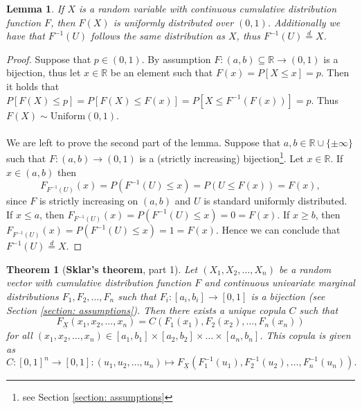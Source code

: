 \documentclass{article}
\newtheorem{theorem}{Theorem}
\newtheorem{lemma}{Lemma}
\begin{document}
\begin{lemma}\label{lemma: inverse cdf}
    If $X$ is a random variable with continuous cumulative distribution function $F$, then $F(X)$ is uniformly distributed over $(0,1)$. Additionally we have that $F^{-1}(U)$ follows the same distribution as $X$, thus $F^{-1}(U) \overset{d}{=} X$.
\end{lemma}
\begin{proof}
    Suppose that $p\in (0,1)$. By assumption $F: (a,b)\subseteq \mathbb{R} \rightarrow (0,1)$ is a bijection, thus let $x\in \mathbb{R}$ be an element such that $F(x) = P[X \leq x] = p$. Then it holds that $P[F(X) \leq p] = P[F(X) \leq F(x)] = P[X \leq F^{-1}(F(x))] = p$. Thus $F(X)\sim \text{Uniform}(0,1)$.\\\\
    We are left to prove the second part of the lemma. Suppose that $a,b\in\mathbb{R}\cup\{\pm\infty\}$ such that $F: (a,b) \rightarrow(0,1)$ is a (strictly increasing) bijection\footnote{see Section \ref{section: assumptions}}. Let $x\in \mathbb{R}$. If $x\in (a,b)$ then
    $$F_{F^{-1}(U)}(x) = P(F^{-1}(U) \leq x) = P(U\leq F(x)) = F(x),$$
    since $F$ is strictly increasing on $(a,b)$ and $U$ is standard uniformly distributed. If $x \leq a$, then $F_{F^{-1}(U)}(x) = P(F^{-1}(U) \leq x) = 0 = F(x)$. If $x\geq b$, then $F_{F^{-1}(U)}(x) = P(F^{-1}(U) \leq x) = 1 = F(x)$. Hence we can conclude that $F^{-1}(U) \overset{d}{=} X$.
\end{proof}
\begin{theorem}[\textbf{Sklar's theorem}, part 1]\cite[Theorem 2]{Copulas}\label{Sklar's theorem}
    Let $(X_1,X_2,\dots,X_n)$ be a random vector with cumulative distribution function $F$ and continuous univariate marginal distributions $F_1,F_2,\dots,F_n$ such that $F_i: [a_i,b_i] \rightarrow [0,1]$ is a bijection (see Section \ref{section: assumptions}). Then there exists a unique copula $C$ such that 
    $$F_{\underline{X}}(x_1,x_2,\dots,x_n) = C(F_1(x_1),F_2(x_2),\dots,F_n(x_n))$$
    for all $(x_1,x_2,\dots,x_n)\in [a_1,b_1]\times[a_2,b_2]\times \dots\times [a_n,b_n]$. This copula is given as
    $$C: [0,1]^n\rightarrow [0,1]: (u_1,u_2,\dots,u_n)\mapsto  F_{\underline{X}}(F_1^{-1}(u_1), F_2^{-1}(u_2),\dots,F_n^{-1}(u_n)).$$ 
\end{theorem}
\end{document}
